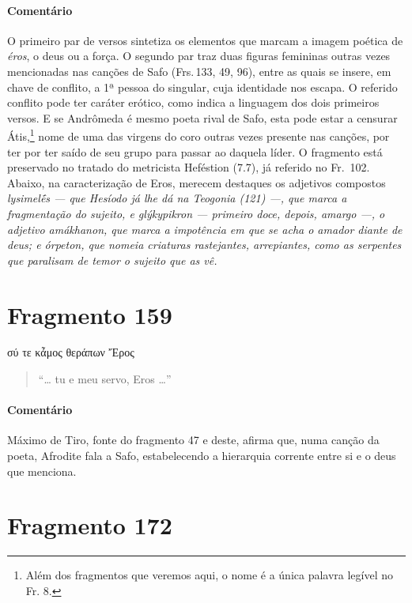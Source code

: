 \pagebreak
{\paragraph{Comentário} O primeiro par de versos sintetiza os elementos que marcam a imagem poética de
\textit{éros}, o deus ou a força. O segundo par traz duas figuras femininas
outras vezes mencionadas nas canções de Safo (Frs.\,133, 49, 96), entre
as quais se insere, em chave de conflito, a 1ª pessoa do singular, cuja
identidade nos escapa. O referido conflito pode ter caráter
erótico, como indica a linguagem dos dois primeiros versos. E se Andrômeda é mesmo poeta rival de Safo, esta pode estar a censurar Átis,\footnote{Além dos fragmentos que veremos aqui, o nome é a única palavra legível no Fr. 8.} nome de uma das virgens do coro outras vezes presente nas canções, por ter
por ter saído de seu grupo para passar ao daquela líder. O fragmento está preservado no tratado do metricista Heféstion (7.7), já
referido no Fr.~102.
Abaixo, na caracterização de Eros, merecem destaques os adjetivos  compostos \textit{lysimelḗs  --- que Hesíodo já lhe dá na \textit{Teogonia} (121) ---, que marca a fragmentação do sujeito, e \textit{glýkypikron} --- primeiro doce, depois, amargo ---, o adjetivo \textit{amákhanon}, que marca a impotência em que se acha o amador diante de deus; e \textit{órpeton}, que nomeia criaturas rastejantes, arrepiantes, como as serpentes que paralisam de temor o sujeito que as vê.}


\pagebreak
\section{Fragmento 159}

\begin{gkverse}
σύ τε κἆμος θεράπων Ἔρος
\end{gkverse}

\begin{verse}
“\ldots{} tu e meu servo, Eros \ldots{}”
\end{verse}

{\paragraph{Comentário} Máximo de Tiro, fonte do fragmento 47 e deste, afirma que, numa canção da poeta,
Afrodite fala a Safo, estabelecendo a hierarquia corrente entre si e o deus que
menciona.}

\section{Fragmento 172}

}
